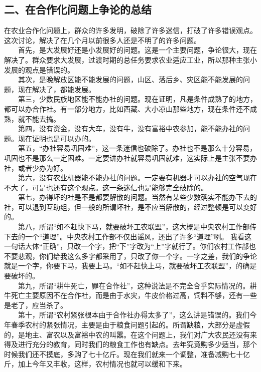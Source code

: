 \documentclass[cn,11pt,chinese]{elegantbook}
\def\myformat#1{\hfil\hfil #1}
\begin{document}
\subsection*{\myformat{二、在合作化问题上争论的总结}}
在农业合作化问题上，群众的许多发明，破除了许多迷信，打破了许多错误观点。这次讨论，解决了在几个月以前很多人还是不明了的许多问题。\\
　　首先，是大发展好还是小发展好的问题。这是一个主要问题，争论很大，现在解决了。群众要求大发展，过渡时期的总任务要求农业适应工业，所以那种主张小发展的观点是错误的。\\
　　其次，是晚解放区能不能发展的问题，山区、落后乡、灾区能不能发展的问题，现在解决了，都能发展。\\
　　第三，少数民族地区能不能办社的问题。现在证明，凡是条件成熟了的地方，都可以办合作社。有一部分地方，比如西藏、大小凉山那些地方，现在条件还不成熟，就不能去搞。\\
　　第四，没有资金，没有大车，没有牛，没有富裕中农参加，能不能办社的问题。现在证明也是可以办的。\\
　　第五，“办社容易巩固难”，这一条迷信也破除了。办社也不是那么十分容易，巩固也不是那么一定困难。一定要讲办社就容易巩固就难，这实际上是主张不要办社，或者少办为好。\\
　　第六，没有农业机器能不能办社的问题。一定要有机器才可以办社的空气现在不大了，可是也还有这个观点。这一条迷信也是能够完全破除的。\\
　　第七，办得坏的社是不是都要解散的问题。当然有某些少数确实不能办下去的社，可以退到互助组，但一般的所谓坏社，是不应当解散的，经过整顿是可以变好的。\\
　　第八，所谓“如不赶快下马，就要破坏工农联盟”，这大概是中央农村工作部传下去的一个“道理”。中央农村工作部不仅出谣风，还出了许多“道理”咧。 我看这一句话大体“正确”，只改一个字，把“下”字改为“上”字就行了。你们农村工作部也不要悲观，你们给我这么多字都采用了，只改了你一个字。一字之差，我们的争论就是一个字，你要下马，我要上马。“如不赶快上马，就要破坏工农联盟”，的确是要破坏的。\\
　　第九，所谓“耕牛死亡，罪在合作社”，这种说法是不完全合乎实际情况的。耕牛死亡主要原因不在合作社，而是由于水灾，牛皮价格过高，饲料不够，还有一些是老了，应当杀了。\\
　　第十，所谓“农村紧张根本由于合作社办得太多了”，这么讲是错误的。我们今年春季农村的紧张情况，主要是由于粮食问题引起的。所谓缺粮，大部分是虚假的，是地主、富农以及富裕中农的叫嚣。在这个问题上，我们对广大农民还没有来得及进行充分的教育，同时我们的粮食工作也有缺点。去年究竟购多少适当，那个时候我们还不摸底，多购了七十亿斤。现在我们就来一个调整，准备减购七十亿斤，加上今年又丰收，这样，农村情况也就可以缓和下来。\\
\end{document}
